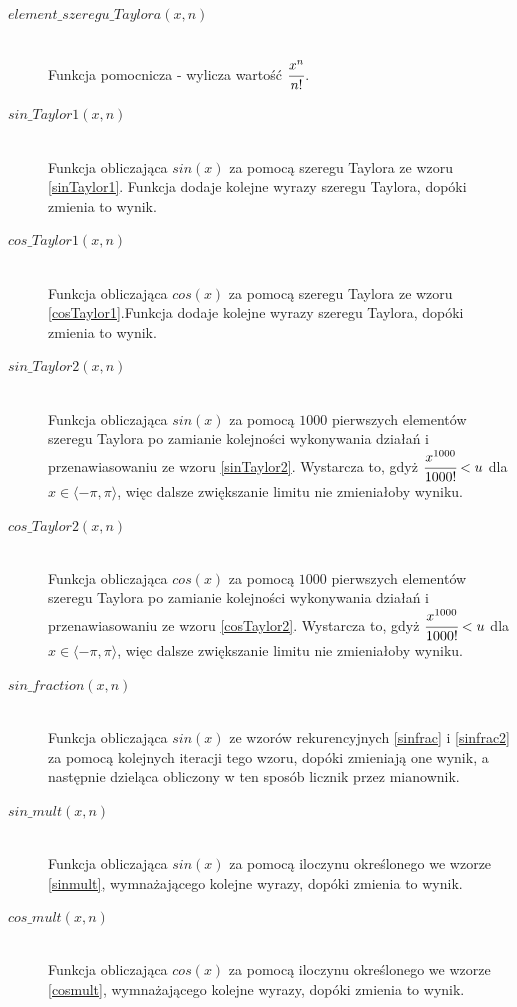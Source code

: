 \documentclass[a4paper]{article}
\begin{document}
\begin{description}
\item[$element\_szeregu\_Taylora(x,n)$] \hfill\\ Funkcja pomocnicza - wylicza wartość $\cfrac{x^n}{n!}$.
\item[$sin\_Taylor1(x,n)$] \hfill\\ Funkcja obliczająca $sin(x)$ za pomocą szeregu Taylora ze wzoru \eqref{sinTaylor1}. Funkcja dodaje kolejne wyrazy szeregu Taylora, dopóki zmienia to wynik.
\item[$cos\_Taylor1(x,n)$] \hfill\\ Funkcja obliczająca $cos(x)$ za pomocą szeregu Taylora ze wzoru \eqref{cosTaylor1}.Funkcja dodaje kolejne wyrazy szeregu Taylora, dopóki zmienia to wynik.
\item[$sin\_Taylor2(x,n)$] \hfill\\ Funkcja obliczająca $sin(x)$ za pomocą $1000$ pierwszych elementów szeregu Taylora po zamianie kolejności wykonywania działań i przenawiasowaniu ze wzoru \eqref{sinTaylor2}. Wystarcza to, gdyż $\cfrac{x^{1000}}{1000!}<u$ dla $x \in \langle -\pi, \pi \rangle$, więc dalsze zwiększanie limitu nie zmieniałoby wyniku.
\item[$cos\_Taylor2(x,n)$] \hfill\\ Funkcja obliczająca $cos(x)$ za pomocą $1000$ pierwszych elementów szeregu Taylora po zamianie kolejności wykonywania działań i przenawiasowaniu ze wzoru \eqref{cosTaylor2}. Wystarcza to, gdyż $\cfrac{x^{1000}}{1000!}<u$ dla $x \in \langle -\pi, \pi \rangle$, więc dalsze zwiększanie limitu nie zmieniałoby wyniku.
\item[$sin\_fraction(x,n)$] \hfill\\ Funkcja obliczająca $sin(x)$ ze wzorów rekurencyjnych \eqref{sinfrac} i \eqref{sinfrac2} za pomocą kolejnych iteracji tego wzoru, dopóki zmieniają one wynik, a następnie dzieląca obliczony w ten sposób licznik przez mianownik.
\item[$sin\_mult(x,n)$] \hfill\\ Funkcja obliczająca $sin(x)$ za pomocą iloczynu określonego we wzorze \eqref{sinmult}, wymnażającego kolejne wyrazy, dopóki zmienia to wynik.
\item[$cos\_mult(x,n)$] \hfill\\ Funkcja obliczająca $cos(x)$ za pomocą iloczynu określonego we wzorze \eqref{cosmult}, wymnażającego kolejne wyrazy, dopóki zmienia to wynik.
\end{description}
\end{document}
